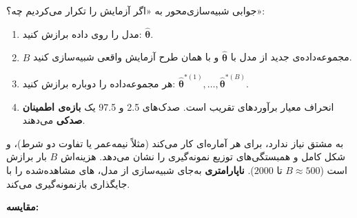 جوابی شبیه‌سازی‌محور به «اگر آزمایش را تکرار می‌کردیم چه؟»:

\begin{enumerate}
\def\labelenumi{\arabic{enumi}.}
\tightlist
\item
  مدل را روی داده برازش کنید: \(\hat{\boldsymbol\theta}\).
\item
  \(B\) مجموعه‌داده‌ی جدید از مدل با \(\hat{\boldsymbol\theta}\) و با همان
  طرح آزمایش واقعی شبیه‌سازی کنید.
\item
  هر مجموعه‌داده را دوباره برازش کنید:
  \(\hat{\boldsymbol\theta}^{*(1)},\allowbreak \dots,\allowbreak \hat{\boldsymbol\theta}^{*(B)}\).
\item
  انحراف معیار برآوردهای  تقریب  است. صدک‌های 2.5 و
  97.5 یک \textbf{بازه‌ی اطمینان صدکی}  می‌دهند.
\end{enumerate}

 به مشتق نیاز ندارد، برای هر آماره‌ای کار می‌کند (مثلاً
نیمه‌عمر یا تفاوت دو شرط)، و شکل کامل و همبستگی‌های توزیع نمونه‌گیری را
نشان می‌دهد. هزینه‌اش \(B\) بار برازش است (\(B \approx 500\) تا \(2000\)).
 \textbf{ناپارامتری} به‌جای شبیه‌سازی از مدل، های
مشاهده‌شده را با جایگذاری بازنمونه‌گیری می‌کند.

\textbf{مقایسه:}

